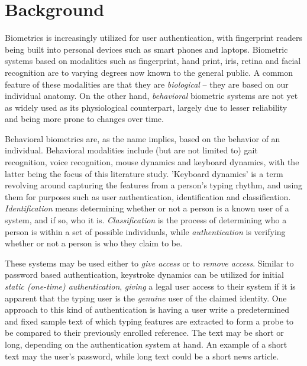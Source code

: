 \documentclass[informationsecurity]{gucmasterproject}
\begin{document}


\chapter{Background}
\label{chap:background}

Biometrics is increasingly utilized for user authentication, with fingerprint readers being built into personal devices such as smart phones and laptops.
Biometric systems based on modalities such as fingerprint, hand print, iris, retina and facial recognition are to varying degrees now known to the general public.
A common feature of these modalities are that they are \textit{biological} -- they are based on our individual anatomy.
On the other hand, \textit{behavioral} biometric systems are not yet as widely used as its physiological counterpart, largely due to lesser reliability and being more prone to changes over time.

Behavioral biometrics are, as the name implies, based on the behavior of an individual. Behavioral modalities include (but are not limited to) gait recognition, voice recognition, mouse dynamics and keyboard dynamics, with the latter being the focus of this literature study.
'Keyboard dynamics' is a term revolving around capturing the features from a person's typing rhythm, and using them for purposes such as user authentication, identification and classification.
\textit{Identification} means determining whether or not a person is a known user of a system, and if so, who it is.
\textit{Classification} is the process of determining who a person is within a set of possible individuals, while \textit{authentication} is verifying whether or not a person is who they claim to be.

These systems may be used either to \textit{give access} or to \textit{remove access}.
Similar to password based authentication, keystroke dynamics can be utilized for initial \textit{static (one-time) authentication}, \textit{giving} a legal user access to their system if it is apparent that the typing user is the \textit{genuine} user of the claimed identity.
One approach to this kind of authentication is having a user write a predetermined and fixed sample text of which typing features are extracted to form a probe to be compared to their previously enrolled reference.
The text may be short or long, depending on the authentication system at hand.  
An example of a short text may the user's password, while long text could be a short news article.
\end{document}

